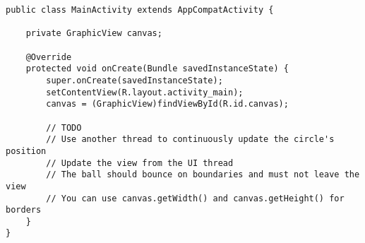 \begin{lstlisting}[style=A_Java]
public class MainActivity extends AppCompatActivity {

    private GraphicView canvas;

    @Override
    protected void onCreate(Bundle savedInstanceState) {
        super.onCreate(savedInstanceState);
        setContentView(R.layout.activity_main);
        canvas = (GraphicView)findViewById(R.id.canvas);

        // TODO
        // Use another thread to continuously update the circle's position
        // Update the view from the UI thread
        // The ball should bounce on boundaries and must not leave the view
        // You can use canvas.getWidth() and canvas.getHeight() for borders
    }
}
\end{lstlisting}


